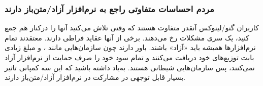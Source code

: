 \subsubsection{مردم احساسات متفاوتی راجع به نرم‌افزار آزاد/متن‌باز دارند}
کاربران گنو/لینوکس آنقدر متفاوت هستند که وقتی تلاش می‌کنید آنها را درکنار هم جمع کنید، یک سری
مشکلات رخ می‌دهند. برخی از آنها عقاید فراطی دارند. معتقدند تمام نرم‌افزارها همیشه باید «آزاد» باشند.
باور دارند چون سازمان‌هایی مانند
،  و 
مبلغ زیادی بابت توزیع‌های خود دریافت می‌کنند و تمام سود خود را صرف حمایت از نرم‌افزار آزاد نمی‌کنند،
پس سازمان‌هایی شیطانی هستند.
به‌یاد داشته باشید که این سه کمپانی تاثیر بسیار قابل توجهی در مشارکت در نرم‌افزار آزاد/متن‌باز دارند.

